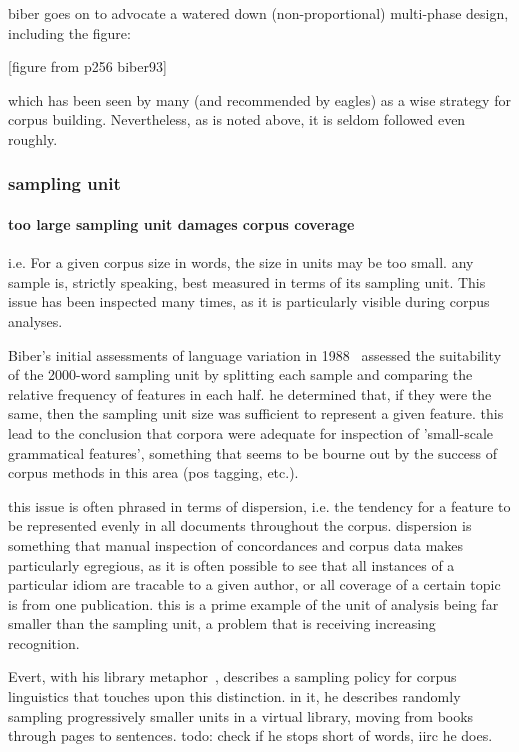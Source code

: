 biber goes on to advocate a watered down (non-proportional) multi-phase design, including the figure:

[figure from p256 biber93]

which has been seen by many (and recommended by eagles) as a wise strategy for corpus building. Nevertheless, as is noted above, it is seldom followed even roughly.


\subsubsection{sampling unit}

\paragraph{ too large sampling unit damages corpus coverage}
i.e. For a given corpus size in words, the size in units may be too small.
any sample is, strictly speaking, best measured in terms of its sampling unit. This issue has been inspected many times, as it is particularly visible during corpus analyses.

Biber's initial assessments of language variation in 1988~\cite{biber1988variation} assessed the suitability of the 2000-word sampling unit by splitting each sample and comparing the relative frequency of features in each half.  he determined that, if they were the same, then the sampling unit size was sufficient to represent a given feature.  this lead to the conclusion that corpora were adequate for inspection of 'small-scale grammatical features', something that seems to be bourne out by the success of corpus methods in this area (pos tagging, etc.).

this issue is often phrased in terms of dispersion, i.e. the tendency for a feature to be represented evenly in all documents throughout the corpus.  dispersion is something that manual inspection of concordances and corpus data makes particularly egregious, as it is often possible to see that all instances of a particular idiom are tracable to a given author, or all coverage of a certain topic is from one publication.  this is a prime example of the unit of analysis being far smaller than the sampling unit, a problem that is receiving increasing recognition.

Evert, with his library metaphor~\cite{evert2006random}, describes a sampling policy for corpus linguistics that touches upon this distinction.  in it, he describes randomly sampling progressively smaller units in a virtual library, moving from books through pages to sentences.  todo: check if he stops short of words, iirc he does.

